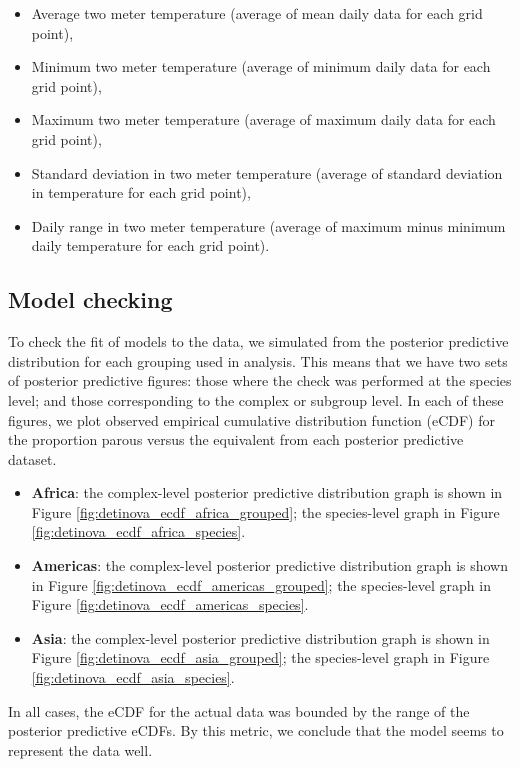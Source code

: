 \documentclass[12pt]{article}
\begin{document}
{\begin{itemize}
	\item Average two meter temperature (average of mean daily data for each grid point),
	\item Minimum two meter temperature (average of minimum daily data for each grid point),
	\item Maximum two meter temperature (average of maximum daily data for each grid point),
	\item Standard deviation in two meter temperature (average of standard deviation in temperature for each grid point),
	\item Daily range in two meter temperature (average of maximum minus minimum daily temperature for each grid point).
\end{itemize}

\subsection{Model checking}
To check the fit of models to the data, we simulated from the posterior predictive distribution for each grouping used in analysis. This means that we have two sets of posterior predictive figures: those where the check was performed at the species level; and those corresponding to the complex or subgroup level. In each of these figures, we plot observed empirical cumulative distribution function (eCDF) for the proportion parous versus the equivalent from each posterior predictive dataset.

\begin{itemize}
	\item \textbf{Africa}: the complex-level posterior predictive distribution graph is shown in Figure \ref{fig:detinova_ecdf_africa_grouped}; the species-level graph in Figure \ref{fig:detinova_ecdf_africa_species}.
	\item \textbf{Americas}: the complex-level posterior predictive distribution graph is shown in Figure \ref{fig:detinova_ecdf_americas_grouped}; the species-level graph in Figure \ref{fig:detinova_ecdf_americas_species}.
	\item \textbf{Asia}: the complex-level posterior predictive distribution graph is shown in Figure \ref{fig:detinova_ecdf_asia_grouped}; the species-level graph in Figure \ref{fig:detinova_ecdf_asia_species}.
\end{itemize}

In all cases, the eCDF for the actual data was bounded by the range of the posterior predictive eCDFs. By this metric, we conclude that the model seems to represent the data well.

}
\end{document}
